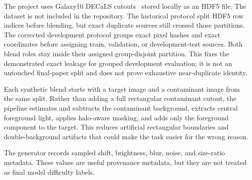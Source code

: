 The project uses Galaxy10 DECaLS cutouts~\cite{galaxy10decals} stored locally as an HDF5 file. The
dataset is not included in the repository. The historical protocol split HDF5
row indices before blending, but exact duplicate sources still crossed those
partitions. The corrected development protocol groups exact pixel hashes and
exact coordinates before assigning train, validation, or development-test
sources. Both blend roles stay inside their assigned group-disjoint partition.
This fixes the demonstrated exact leakage for grouped development evaluation;
it is not an untouched final-paper split and does not prove exhaustive
near-duplicate identity.

Each synthetic blend starts with a target image and a contaminant image from the
same split. Rather than adding a full rectangular contaminant cutout, the
pipeline estimates and subtracts the contaminant background, extracts central
foreground light, applies halo-aware masking, and adds only the foreground
component to the target. This reduces artificial rectangular boundaries and
double-background artifacts that could make the task easier for the wrong
reason.

The generator records sampled shift, brightness, blur, noise, and size-ratio
metadata. These values are useful provenance metadata, but they are not treated
as final model difficulty labels.

